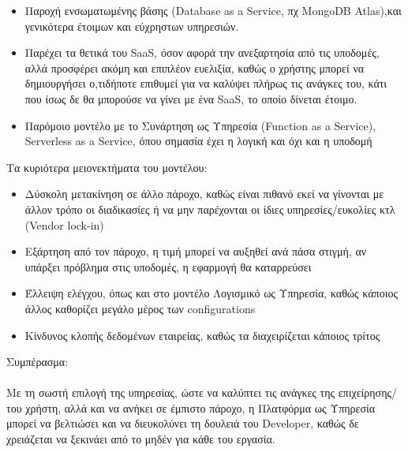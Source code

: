 \documentclass{article}
\begin{document}
\begin{itemize}
\item Παροχή ενσωματωμένης βάσης (Database as a Service, πχ MongoDB Atlas),και γενικότερα έτοιμων και εύχρηστων υπηρεσιών.
\item Παρέχει τα θετικά του SaaS, όσον αφορά την ανεξαρτησία από τις υποδομές, αλλά προσφέρει ακόμη και επιπλέον ευελιξία, καθώς ο χρήστης μπορεί να δημιουργήσει ο,τιδήποτε επιθυμεί για να καλύψει πλήρως τις ανάγκες του, κάτι που ίσως δε θα μπορούσε να γίνει με ένα SaaS, το οποίο δίνεται έτοιμο.
\item Παρόμοιο μοντέλο με το Συνάρτηση ως Υπηρεσία (Function as a Service), Serverless as a Service, όπου σημασία έχει η λογική και όχι και η υποδομή
\end{itemize}
Τα κυριότερα μειονεκτήματα του μοντέλου:
\begin{itemize}
\item Δύσκολη μετακίνηση σε άλλο πάροχο, καθώς είναι πιθανό εκεί να γίνονται με άλλον τρόπο οι διαδικασίες ή να μην παρέχονται οι ίδιες υπηρεσίες/ευκολίες κτλ (Vendor lock-in)
\item Εξάρτηση από τον πάροχο, η τιμή μπορεί να αυξηθεί ανά πάσα στιγμή, αν υπάρξει πρόβλημα στις υποδομές, η εφαρμογή θα καταρρεύσει
\item Έλλειψη ελέγχου, όπως και στο μοντέλο Λογισμικό ως Υπηρεσία, καθώς κάποιος άλλος καθορίζει μεγάλο μέρος των configurations
\item Κίνδυνος κλοπής δεδομένων εταιρείας, καθώς τα διαχειρίζεται κάποιος τρίτος
\end{itemize}
Συμπέρασμα: \\ \\
Με τη σωστή επιλογή της υπηρεσίας, ώστε να καλύπτει τις ανάγκες της επιχείρησης/του χρήστη, αλλά και να ανήκει σε έμπιστο πάροχο, η Πλατφόρμα ως Υπηρεσία μπορεί να βελτιώσει και να διευκολύνει τη δουλειά του Developer, καθώς δε χρειάζεται να ξεκινάει από το μηδέν για κάθε του εργασία.
\end{document}
